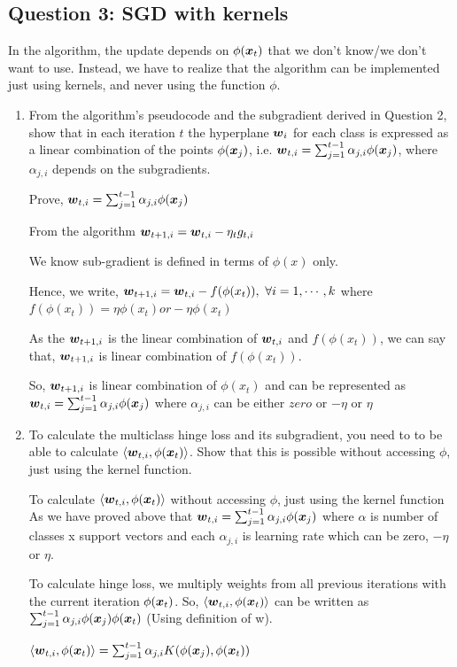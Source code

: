 \documentclass{article}
\begin{document}
\subsection{Question 3: SGD with kernels}
In the algorithm, the update depends on $\phi(\boldsymbol{x}_t)$ that we don't know/we don't want to use. Instead, we have to realize that the algorithm can be implemented just using kernels, and never using the function $\phi$.
\begin{enumerate}[label=(\alph*)]

\item From the algorithm's pseudocode and the subgradient derived in Question 2, show that in each iteration $t$ the hyperplane $\boldsymbol{w}_i$ for each class is expressed as a linear combination of the points $\phi(\boldsymbol{x}_j)$, i.e. $\boldsymbol{w}_{t,i}=\sum_{j=1}^{t-1} \alpha_{j,i} \phi(\boldsymbol{x}_j)$, where $\alpha_{j,i}$ depends on the subgradients.
\begin{mdframed}[backgroundcolor=lightgray]
Prove, $\boldsymbol{w}_{t,i}=\sum_{j=1}^{t-1} \alpha_{j,i} \phi(\boldsymbol{x}_j)$

From the algorithm
$\boldsymbol{w}_{t+1,i} = \boldsymbol{w}_{t,i} -\eta_t g_{t,i}$

We know sub-gradient is defined in terms of $\phi(x)$ only.

Hence, we write,
$\boldsymbol{w}_{t+1,i} = \boldsymbol{w}_{t,i} -f(\phi(x_t)), \ \forall i=1,\cdots,k$ where $f(\phi(x_t)) = \eta \phi(x_t) or -\eta \phi(x_t)$

As the $\boldsymbol{w}_{t+1,i}$ is the linear combination of $\boldsymbol{w}_{t,i}$ and $f(\phi(x_t))$, we can say that, $\boldsymbol{w}_{t+1,i}$ is linear combination of $f(\phi(x_t))$.

So, $\boldsymbol{w}_{t+1,i}$ is linear combination of $\phi(x_t)$ and can be represented as $\boldsymbol{w}_{t,i}=\sum_{j=1}^{t-1} \alpha_{j,i} \phi(\boldsymbol{x}_j)$ where $\alpha_{j,i}$ can be either $zero$ or $-\eta$ or $\eta$

\end{mdframed}

\item To calculate the multiclass hinge loss and its subgradient, you need to to be able to calculate $\langle \boldsymbol{w}_{t,i}, \phi(\boldsymbol{x}_t)\rangle$. Show that this is possible without accessing $\phi$, just using the kernel function.
\begin{mdframed}[backgroundcolor=lightgray]
To calculate $\langle \boldsymbol{w}_{t,i}, \phi(\boldsymbol{x}_t)\rangle$ without accessing $\phi$, just using the kernel function
As we have proved above that $\boldsymbol{w}_{t,i}=\sum_{j=1}^{t-1} \alpha_{j,i} \phi(\boldsymbol{x}_j)$ where $\alpha$ is number of classes x support vectors and each $\alpha_{j,i}$ is learning rate which can be zero, $-\eta$ or $\eta$.

To calculate hinge loss, we multiply weights from all previous iterations with the current iteration $\phi(\boldsymbol{x}_t)$. So, $\langle \boldsymbol{w}_{t,i}, \phi(\boldsymbol{x}_t)\rangle$ can be written as $\sum_{j=1}^{t-1} \alpha_{j,i} \phi(\boldsymbol{x}_j)\phi(\boldsymbol{x}_t)$ (Using definition of w).
                    
$\langle \boldsymbol{w}_{t,i}, \phi(\boldsymbol{x}_t)\rangle = \sum_{j=1}^{t-1} \alpha_{j,i}K(\phi(\boldsymbol{x}_j),\phi(\boldsymbol{x}_t))$

\end{mdframed}

\end{enumerate}
\end{document}
